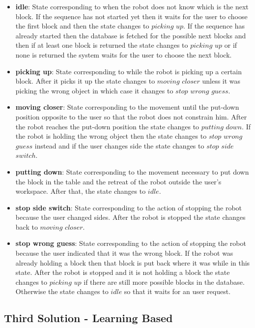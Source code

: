 \begin{itemize}
    \item \textbf{idle}: State corresponding to when the robot does not know which is the next block. If the sequence has not started yet then it waits for the user to choose the first block and then the state changes to $picking$ $up$. If the sequence has already started then the database is fetched for the possible next blocks and then if at least one block is returned the state changes to $picking$ $up$ or if none is returned the system waits for the user to choose the next block.
    \item \textbf{picking up}: State corresponding to while the robot is picking up a certain block. After it picks it up the state changes to $moving$ $closer$ unless it was picking the wrong object in which case it changes to $stop$ $wrong$ $guess$.
    \item \textbf{moving closer}: State corresponding to the movement until the put-down position opposite to the user so that the robot does not constrain him. After the robot reaches the put-down position the state changes to $putting$ $down$. If the robot is holding the wrong object then the state changes to $stop$ $wrong$ $guess$ instead and if the user changes side the state changes to $stop$ $side$ $switch$.
    \item \textbf{putting down}: State corresponding to the movement necessary to put down the block in the table and the retreat of the robot outside the user's workspace. After that, the state changes to $idle$.
    \item \textbf{stop side switch}: State corresponding to the action of stopping the robot because the user changed sides. After the robot is stopped the state changes back to $moving$ $closer$.
    \item \textbf{stop wrong guess}: State corresponding to the action of stopping the robot because the user indicated that it was the wrong block. If the robot was already holding a block then that block is put back where it was while in this state. After the robot is stopped and it is not holding a block the state changes to $picking$ $up$ if there are still more possible blocks in the database. Otherwise the state changes to $idle$ so that it waits for an user request.
\end{itemize}

\subsection{Third Solution - Learning Based}